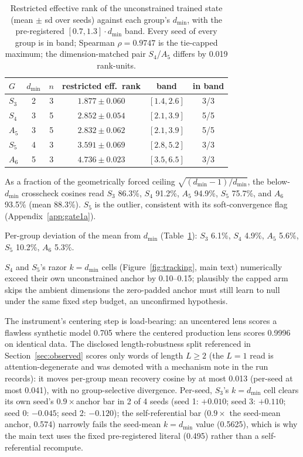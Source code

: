 \documentclass[mlabstract,onecolumn]{jmlr}
\newcommand{\dmin}{d_{\min}}
\begin{document}
\begin{table}[h]
\centering
\small
\begin{tabular}{lccccc}
\toprule
$G$ & $\dmin$ & $n$ & restricted eff.\ rank & band & in band \\
\midrule
$S_3$ & 2 & 3 & $1.877 \pm 0.060$ & $[1.4, 2.6]$ & 3/3 \\
$S_4$ & 3 & 5 & $2.852 \pm 0.054$ & $[2.1, 3.9]$ & 5/5 \\
$A_5$ & 3 & 5 & $2.832 \pm 0.062$ & $[2.1, 3.9]$ & 5/5 \\
$S_5$ & 4 & 3 & $3.591 \pm 0.069$ & $[2.8, 5.2]$ & 3/3 \\
$A_6$ & 5 & 3 & $4.736 \pm 0.023$ & $[3.5, 6.5]$ & 3/3 \\
\bottomrule
\end{tabular}
\caption{Restricted effective rank of the unconstrained trained state
(mean $\pm$ sd over seeds) against each group's $\dmin$, with the
pre-registered $[0.7, 1.3] \cdot \dmin$ band. Every seed of every group is
in band; Spearman $\rho = 0.9747$ is the tie-capped maximum; the
dimension-matched pair $S_4$/$A_5$ differs by 0.019 rank-units.}
\label{tab:m1}
\end{table}

As a fraction of the geometrically forced ceiling
$\sqrt{(\dmin{-}1)/\dmin}$, the below-$\dmin$ crosscheck cosines read
$S_3$ 86.3\%, $S_4$ 91.2\%, $A_5$ 94.9\%, $S_5$ 75.7\%, and $A_6$
93.5\% (mean 88.3\%). $S_5$ is the outlier, consistent with its
soft-convergence flag (Appendix~\ref{app:gate1a}).

Per-group deviation of the mean from $\dmin$ (Table~\ref{tab:m1}):
$S_3$ 6.1\%, $S_4$ 4.9\%, $A_5$ 5.6\%, $S_5$ 10.2\%, $A_6$ 5.3\%.

$S_4$ and $S_5$'s razor $k{=}\dmin$ cells (Figure~\ref{fig:tracking},
main text) numerically exceed their own unconstrained anchor by 0.10--0.15;
plausibly the capped arm skips the ambient dimensions the zero-padded
anchor must still learn to null under the same fixed step budget, an
unconfirmed hypothesis.

The instrument's centering step is load-bearing: an uncentered lens
scores a flawless synthetic model 0.705 where the centered production
lens scores 0.9996 on identical data.
The disclosed length-robustness split referenced in
Section~\ref{sec:observed} scores only words of length $L \geq 2$ (the
$L = 1$ read is attention-degenerate and was demoted with a mechanism
note in the run records): it moves per-group mean recovery cosine by at
most 0.013 (per-seed at most 0.041), with no group-selective divergence.
Per-seed, $S_3$'s $k{=}\dmin$ cell clears its own seed's $0.9\times$anchor
bar in 2 of 4 seeds (seed 1: $+0.010$; seed 3: $+0.110$; seed 0: $-0.045$;
seed 2: $-0.120$); the self-referential bar ($0.9\times$ the seed-mean
anchor, 0.574) narrowly fails the seed-mean $k{=}\dmin$ value (0.5625),
which is why the main text uses the fixed pre-registered literal (0.495)
rather than a self-referential recompute.
\end{document}
